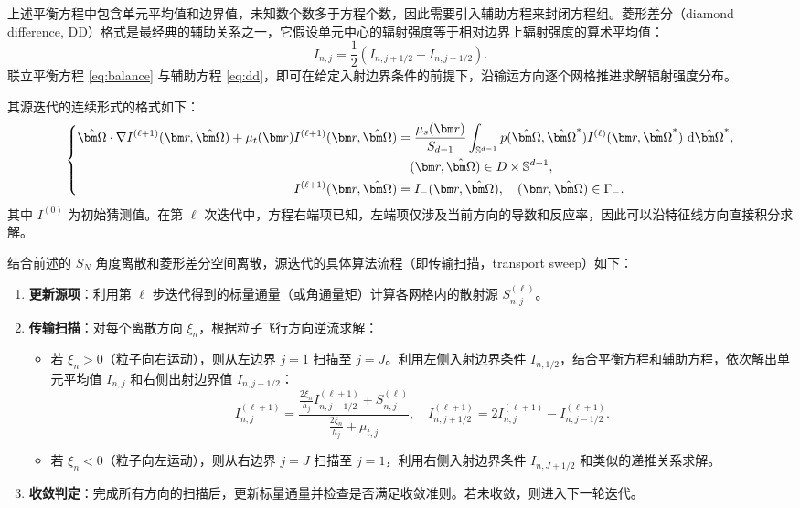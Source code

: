 上述平衡方程中包含单元平均值和边界值，未知数个数多于方程个数，因此需要引入辅助方程来封闭方程组。菱形差分（diamond difference, DD）格式是最经典的辅助关系之一，它假设单元中心的辐射强度等于相对边界上辐射强度的算术平均值：
\begin{equation}\label{eq:dd}
    I_{n,j} = \frac{1}{2} (I_{n, j+1/2} + I_{n, j-1/2}).
\end{equation}
联立平衡方程 \eqref{eq:balance} 与辅助方程 \eqref{eq:dd}，即可在给定入射边界条件的前提下，沿输运方向逐个网格推进求解辐射强度分布。

其源迭代的连续形式的格式如下：
\begin{equation}
    \left\{
    \begin{aligned}
        \bOmega \cdot \nabla I^{(\ell+1)}(\br, \bOmega) + \mut(\br) I^{(\ell+1)}(\br, \bOmega)
                                   & = \frac{\mus(\br)}{S_{d-1}}
        \int_{\sS^{d-1}} p(\bOmega, \bOmega^*) I^{(\ell)}(\br, \bOmega^*) \, \diff{\bOmega^*}, \\
                                   & \quad (\br,\bOmega)\in D \times \sS^{d-1},                \\
        I^{(\ell+1)}(\br, \bOmega) & = I_{-}(\br, \bOmega),
        \quad (\br,\bOmega)\in \Gamma_{-}.
    \end{aligned}
    \right.
\end{equation}
其中 $I^{(0)}$ 为初始猜测值。在第 $\ell$ 次迭代中，方程右端项已知，左端项仅涉及当前方向的导数和反应率，因此可以沿特征线方向直接积分求解。

结合前述的 $S_N$ 角度离散和菱形差分空间离散，源迭代的具体算法流程（即传输扫描，transport sweep）如下：
\begin{enumerate}
    \item \textbf{更新源项}：利用第 $\ell$ 步迭代得到的标量通量（或角通量矩）计算各网格内的散射源 $S_{n,j}^{(\ell)}$。
    \item \textbf{传输扫描}：对每个离散方向 $\xi_n$，根据粒子飞行方向逆流求解：
          \begin{itemize}
              \item 若 $\xi_n > 0$（粒子向右运动），则从左边界 $j=1$ 扫描至 $j=J$。利用左侧入射边界条件 $I_{n, 1/2}$，结合平衡方程和辅助方程，依次解出单元平均值 $I_{n,j}$ 和右侧出射边界值 $I_{n, j+1/2}$：
                    \begin{equation}
                        I_{n,j}^{(\ell+1)} = \frac{\frac{2\xi_n}{h_j} I_{n, j-1/2}^{(\ell+1)} + S_{n,j}^{(\ell)}}{\frac{2\xi_n}{h_j} + \mu_{t,j}}, \quad I_{n, j+1/2}^{(\ell+1)} = 2 I_{n,j}^{(\ell+1)} - I_{n, j-1/2}^{(\ell+1)}.
                    \end{equation}
              \item 若 $\xi_n < 0$（粒子向左运动），则从右边界 $j=J$ 扫描至 $j=1$，利用右侧入射边界条件 $I_{n, J+1/2}$ 和类似的递推关系求解。
          \end{itemize}
    \item \textbf{收敛判定}：完成所有方向的扫描后，更新标量通量并检查是否满足收敛准则。若未收敛，则进入下一轮迭代。
\end{enumerate}

